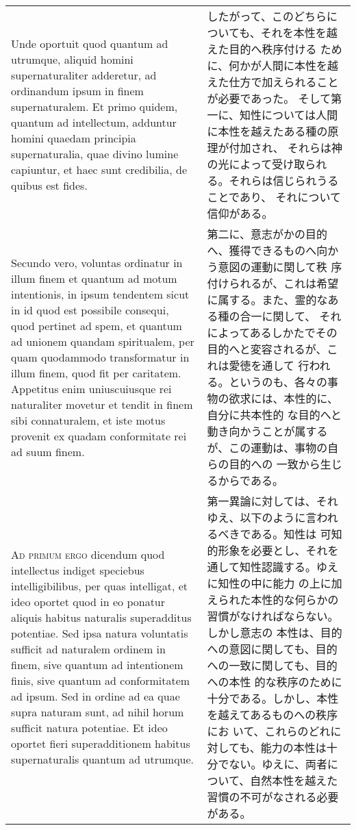 \documentclass[10pt]{jsarticle}
\begin{document}
\begin{longtable}{p{21em}p{21em}}
\\


 Unde oportuit quod quantum ad utrumque, aliquid homini
supernaturaliter adderetur, ad ordinandum ipsum in finem
supernaturalem. Et primo quidem, quantum ad intellectum, adduntur
homini quaedam principia supernaturalia, quae divino lumine capiuntur,
et haec sunt credibilia, de quibus est fides.

&

 したがって、このどちらについても、それを本性を越えた目的へ秩序付ける
 ために、何かが人間に本性を越えた仕方で加えられることが必要であった。
 そして第一に、知性については人間に本性を越えたある種の原理が付加され、
 それらは神の光によって受け取られる。それらは信じられうることであり、
 それについて信仰がある。
 
\\


 Secundo vero, voluntas ordinatur in illum finem et quantum ad motum
intentionis, in ipsum tendentem sicut in id quod est possibile
consequi, quod pertinet ad spem, et quantum ad unionem quandam
spiritualem, per quam quodammodo transformatur in illum finem, quod
fit per caritatem. Appetitus enim uniuscuiusque rei naturaliter
movetur et tendit in finem sibi connaturalem, et iste motus provenit
ex quadam conformitate rei ad suum finem.

&

 第二に、意志がかの目的へ、獲得できるものへ向かう意図の運動に関して秩
 序付けられるが、これは希望に属する。また、霊的なある種の合一に関して、
 それによってあるしかたでその目的へと変容されるが、これは愛徳を通して
 行われる。というのも、各々の事物の欲求には、本性的に、自分に共本性的
 な目的へと動き向かうことが属するが、この運動は、事物の自らの目的への
 一致から生じるからである。
 
\\



{\scshape Ad primum ergo} dicendum quod intellectus indiget speciebus
intelligibilibus, per quas intelligat, et ideo oportet quod in eo
ponatur aliquis habitus naturalis superadditus potentiae. Sed ipsa
natura voluntatis sufficit ad naturalem ordinem in finem, sive quantum
ad intentionem finis, sive quantum ad conformitatem ad ipsum. Sed in
ordine ad ea quae supra naturam sunt, ad nihil horum sufficit natura
potentiae. Et ideo oportet fieri superadditionem habitus
supernaturalis quantum ad utrumque.

&

 第一異論に対しては、それゆえ、以下のように言われるべきである。知性は
 可知的形象を必要とし、それを通して知性認識する。ゆえに知性の中に能力
 の上に加えられた本性的な何らかの習慣がなければならない。しかし意志の
 本性は、目的への意図に関しても、目的への一致に関しても、目的への本性
 的な秩序のために十分である。しかし、本性を越えてあるものへの秩序にお
 いて、これらのどれに対しても、能力の本性は十分でない。ゆえに、両者に
 ついて、自然本性を越えた習慣の不可がなされる必要がある。
 

\end{longtable}
\end{document}

